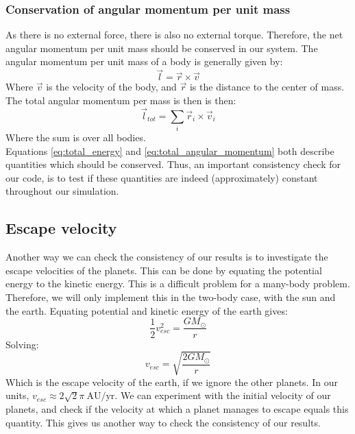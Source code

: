 \documentclass[a4paper, 10pt]{article}
\begin{document}
\subsubsection{Conservation of angular momentum per unit mass}
As there is no external force, there is also no external torque. Therefore, the net angular momentum per unit mass should be conserved in our system. The angular momentum per unit mass of a body is generally given by:
$$\vec{l}=\vec{r}\times \vec{v}$$
Where $\vec{v}$ is the velocity of the body, and $\vec{r}$ is the distance to the center of mass. The total angular momentum per mass is then is then:
\begin{equation}\label{eq:total_angular_momentum}
\vec{l}_{tot}=\sum_i \vec{r}_i\times \vec{v}_i
\end{equation}
Where the sum is over all bodies.\\
\linebreak
Equations \ref{eq:total_energy} and \ref{eq:total_angular_momentum} both describe quantities which should be conserved. Thus, an important consistency check for our code, is to test if these quantities are indeed (approximately) constant throughout our simulation.
\subsection{Escape velocity}\label{escape_vel_section}
Another way we can check the consistency of our results is to investigate the escape velocities of the planets. This can be done by equating the potential energy to the kinetic energy. This is a difficult problem for a many-body problem. Therefore, we will only implement this in  the two-body case, with the sun and the earth. Equating potential and kinetic energy of the earth gives: 
$$\frac{1}{2}v_{esc}^2=\frac{GM_{\odot}}{r}$$
Solving:
\begin{equation}
v_{esc}=\sqrt{\frac{2GM_{\odot}}{r}}
\end{equation}
Which is the escape velocity of the earth, if we ignore the other planets. In our units, $v_{esc} \approx 2\sqrt{2}\pi\ \mathrm{AU/yr}$. We can experiment with the initial velocity of our planets, and check if the velocity at which a planet manages to escape equals this quantity. This gives us another way to check the consistency of our results.
\end{document}
